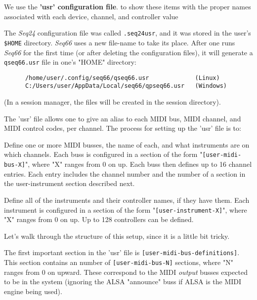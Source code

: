   We use the \textbf{'usr' configuration file}.
   to show these items with the proper
   names associated with each device, channel, and controller value

   The \textsl{Seq24} configuration file was called
   \texttt{.seq24usr}, and it was stored in the user's \texttt{\$HOME}
   directory.
   \textsl{Seq66} uses a new file-name
   to take its place.
   After one runs \textsl{Seq66} for the first time (or after deleting
   the configuration files), it will generate a
   \texttt{qseq66.usr} file in one's "HOME" directory:

   \begin{verbatim}
      /home/user/.config/seq66/qseq66.usr             (Linux)
      C:/Users/user/AppData/Local/seq66/qpseq66.usr   (Windows)
   \end{verbatim}

   (In a session manager, the files will be created in the session directory).

   The 'usr' file allows one to give an alias to 
   each MIDI bus, MIDI channel, and MIDI control 
   codes, per channel.
   The process for setting up the 'usr' file is to:

   \begin{enumber}
      \item Define one or more MIDI busses, the name of each, and what
         instruments are on which channels.  Each buss is configured in a
         section of the form "\texttt{[user-midi-bus-X]}", where "X" ranges
         from 0 on up.  Each buss then defines up to 16 channel entries.
         Each entry includes the channel number and the number of a
         section in the user-instrument section described next.
      \item Define all of the instruments and their controller
         names, if they have them.  Each instrument is configured in a
         section of the form "\texttt{[user-instrument-X]}", where "X"
         ranges from 0 on up.  Up to 128 controllers can be defined.
   \end{enumber}

   Let's walk through the structure of this setup, since it is a little bit
   tricky.

   The first important section in the 'usr' file
   is \texttt{[user-midi-bus-definitions]}.
   This section contains an number
   of \texttt{[user-midi-bus-N]} sections, where "N" ranges from 0 on upward.
   These correspond to the MIDI \textsl{output}
   busses expected to be in the system (ignoring the ALSA "announce" buss if
   ALSA is the MIDI engine being used).

